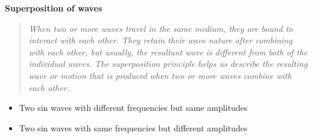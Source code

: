\begin{center}
    \textbf{Superposition of waves}
    \begin{quote}
        \textit{When two or more waves travel in the same medium, they are bound to interact with each other. They retain their wave nature after combining with each other, but usually, the resultant wave is different from both of the individual waves. The superposition principle helps us describe the resulting wave or motion that is produced when two or more waves combine with each other. }
    \end{quote}
\end{center}
\begin{itemize}
    \item Two sin waves with different frequencies but same amplitudes\\
    
    \item Two sin waves with same frequencies but different amplitudes\\


\end{itemize}

